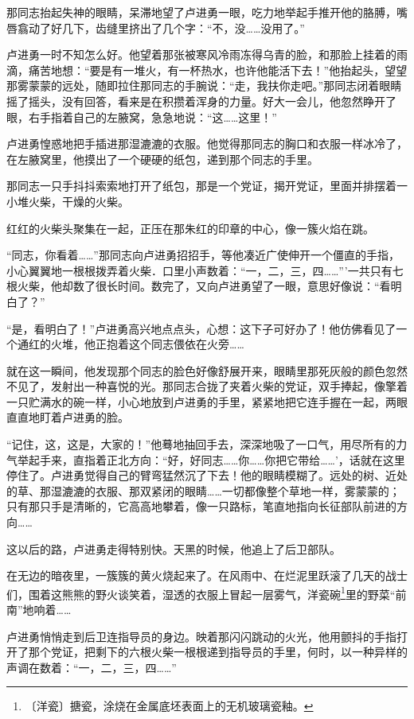 \documentclass[12pt,UTF-8,openany]{ctexbook}
\begin{document}
\begin{normalsize}
    那同志抬起失神的眼睛，呆滞地望了卢进勇一眼，吃力地举起手推开他的胳膊，嘴唇翕动了好几下，齿缝里挤出了几个字：“不，没……没用了。”
    
    卢进勇一时不知怎么好。他望着那张被寒风冷雨冻得乌青的脸，和那脸上挂着的雨滴，痛苦地想：“要是有一堆火，有一杯热水，也许他能活下去！”他抬起头，望望那雾蒙蒙的远处，随即拉住那同志的手腕说：“走，我扶你走吧。”那同志闭着眼睛摇了摇头，没有回答，看来是在积攒着浑身的力量。好大一会儿，他忽然睁开了眼，右手指着自己的左腋窝，急急地说：“这……这里！”
    
    卢进勇惶惑地把手插进那湿漉漉的衣服。他觉得那同志的胸口和衣服一样冰冷了，在左腋窝里，他摸出了一个硬硬的纸包，递到那个同志的手里。
    
    那同志一只手抖抖索索地打开了纸包，那是一个党证，揭开党证，里面并排摆着一小堆火柴，干燥的火柴。
    
    红红的火柴头聚集在一起，正压在那朱红的印章的中心，像一簇火焰在跳。
    
    “同志，你看着……”那同志向卢进勇招招手，等他凑近广使伸开一个僵直的手指，小心翼翼地一根根拨弄着火柴．口里小声数着：“一，二，三，四……”’一共只有七根火柴，他却数了很长时间。数完了，又向卢进勇望了一眼，意思好像说：“看明白了？”
    
    “是，看明白了！”卢进勇高兴地点点头，心想：这下子可好办了！他仿佛看见了一个通红的火堆，他正抱着这个同志偎依在火旁……
    
    就在这一瞬间，他发现那个同志的脸色好像舒展开来，眼睛里那死灰般的颜色忽然不见了，发射出一种喜悦的光。那同志合拢了夹着火柴的党证，双手捧起，像擎着一只贮满水的碗一样，小心地放到卢进勇的手里，紧紧地把它连手握在一起，两眼直直地盯着卢进勇的脸。
    
    “记住，这，这是，大家的！”他蓦地抽回手去，深深地吸了一口气，用尽所有的力气举起手来，直指着正北方向：“好，好同志……你……你把它带给……’，话就在这里停住了。卢进勇觉得自己的臂弯猛然沉了下去！他的眼睛模糊了。远处的树、近处的草、那湿漉漉的衣服、那双紧闭的眼睛……一切都像整个草地一样，雾蒙蒙的；只有那只手是清晰的，它高高地攀着，像一只路标，笔直地指向长征部队前进的方向……
    
    这以后的路，卢进勇走得特别快。天黑的时候，他追上了后卫部队。
    
    在无边的暗夜里，一簇簇的黄火烧起来了。在风雨中、在烂泥里跃滚了几天的战士们，围着这熊熊的野火谈笑着，湿透的衣服上冒起一层雾气，洋瓷碗\footnote{〔洋瓷〕搪瓷，涂烧在金属底坯表面上的无机玻璃瓷釉。}里的野菜“前南”地响着……
    
    卢进勇悄悄走到后卫连指导员的身边。映着那闪闪跳动的火光，他用颤抖的手指打开了那个党证，把剩下的六根火柴一根根递到指导员的手里，何时，以一种异样的声调在数着：“一，二，三，四……”
    
\end{normalsize}
\end{document}
